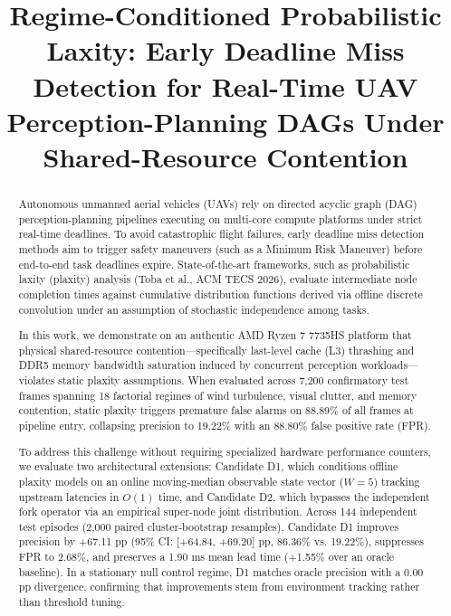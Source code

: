 \documentclass[conference]{IEEEtran}
\begin{document}
\title{Regime-Conditioned Probabilistic Laxity: Early Deadline Miss Detection for Real-Time UAV Perception-Planning DAGs Under Shared-Resource Contention}

\author{
}

\maketitle

\begin{abstract}
Autonomous unmanned aerial vehicles (UAVs) rely on directed acyclic graph (DAG) perception-planning pipelines executing on multi-core compute platforms under strict real-time deadlines. To avoid catastrophic flight failures, early deadline miss detection methods aim to trigger safety maneuvers (such as a Minimum Risk Maneuver) before end-to-end task deadlines expire. State-of-the-art frameworks, such as probabilistic laxity (plaxity) analysis (Toba et al., ACM TECS 2026), evaluate intermediate node completion times against cumulative distribution functions derived via offline discrete convolution under an assumption of stochastic independence among tasks.

In this work, we demonstrate on an authentic AMD Ryzen 7 7735HS platform that physical shared-resource contention---specifically last-level cache (L3) thrashing and DDR5 memory bandwidth saturation induced by concurrent perception workloads---violates static plaxity assumptions. When evaluated across 7,200 confirmatory test frames spanning 18 factorial regimes of wind turbulence, visual clutter, and memory contention, static plaxity triggers premature false alarms on 88.89\% of all frames at pipeline entry, collapsing precision to 19.22\% with an 88.80\% false positive rate (FPR).

To address this challenge without requiring specialized hardware performance counters, we evaluate two architectural extensions: Candidate D1, which conditions offline plaxity models on an online moving-median observable state vector ($W=5$) tracking upstream latencies in $O(1)$ time, and Candidate D2, which bypasses the independent fork operator via an empirical super-node joint distribution. Across 144 independent test episodes (2,000 paired cluster-bootstrap resamples), Candidate D1 improves precision by +67.11 pp (95\% CI: [+64.84, +69.20] pp, 86.36\% vs. 19.22\%), suppresses FPR to 2.68\%, and preserves a 1.90 ms mean lead time (+1.55\% over an oracle baseline). In a stationary null control regime, D1 matches oracle precision with a 0.00 pp divergence, confirming that improvements stem from environment tracking rather than threshold tuning.


\end{abstract}
\end{document}
